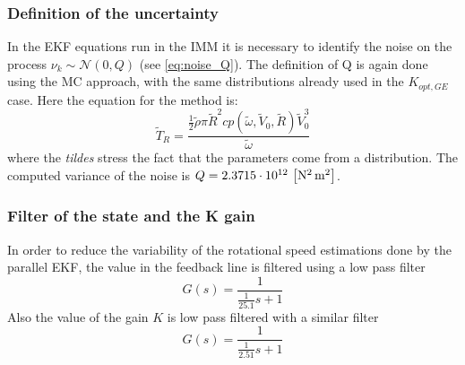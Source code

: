 \subsubsection{Definition of the uncertainty}
In the EKF equations run in the IMM it is necessary to identify the noise on the process $\nu_k \sim \mathcal{N}(0, Q)$ (see \autoref{eq:noise_Q}). The definition of Q is again done using the \acrshort{MC} approach, with the same distributions already used in the $K_{opt,GE}$ case. Here the equation for the method is:
\begin{equation}
  \tilde{T}_R=\frac{\frac{1}{2}\tilde{\rho}\pi\tilde{R}^2cp\left(\tilde{\omega}, \tilde{V}_0,\tilde{R}\right)\tilde{V}_0^3}{\tilde{\omega}}
  \label{eq:T_R_distribution}
\end{equation}
where the \textit{tildes} stress the fact that the parameters come from a distribution. The computed variance of the noise is $Q = 2.3715 \cdot 10^{12} \, \left[\si{\square\newton\square\meter}\right]$.

\subsubsection{Filter of the state and the K gain}
In order to reduce the variability of the rotational speed estimations done by the parallel \acrshort{EKF}, the value in the feedback line is filtered using a low pass filter
\begin{equation}
  G(s) = \frac{1}{\frac{1}{25.1}s + 1}
\end{equation}
Also the value of the gain $K$ is low pass filtered with a similar filter
\begin{equation}
  G(s) = \frac{1}{\frac{1}{2.51}s + 1}
\end{equation}

